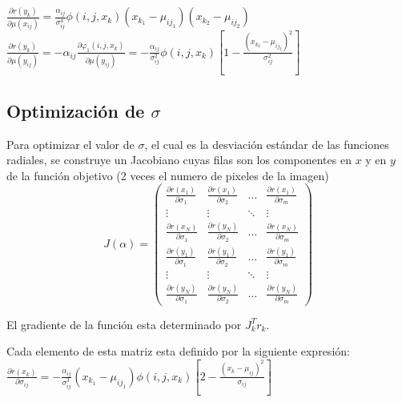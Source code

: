 \documentclass[10pt,journal,compsoc]{styles/IEEEtran}
\begin{document}
$\frac{\partial r(y_k)}{\partial \mu(x_{ij})}=\frac{\alpha_{ij}}{\sigma_{ij}^4}\phi(i,j,x_k)(x_{k_1}-\mu_{ij_1})(x_{k_2}-\mu_{ij_2})$\\

\small 
$\frac{\partial r(y_k)}{\partial \mu(y_{ij})}=- \alpha_{ij} \frac{\partial \varphi_1(i,j,x_k)}{\partial \mu(y_{ij})} =- \frac{\alpha_{ij}}{\sigma_{ij}^2}\phi(i,j,x_k)[1-\frac{(x_{k_2}-\mu_{ij_2})^2}{\sigma_{ij}^2}] $\\
\normalsize

\subsection{Optimización de $\sigma$}

Para optimizar el valor de $\sigma$, el cual es la desviación estándar de las funciones radiales, se construye un Jacobiano cuyas filas son los componentes en $x$ y en $y$ de la función objetivo (2 veces el numero de pixeles de la imagen)\\

\[J(\alpha)= \left( \begin{array}{cccc}
\frac{\partial r(x_1)}{\partial \sigma_1} & \frac{\partial r(x_1)}{\partial \sigma_2} & \ldots & \frac{\partial r(x_1)}{\partial \sigma_m} \\
\vdots & \vdots & \ddots & \vdots \\
\frac{\partial r(x_N)}{\partial \sigma_1} & \frac{\partial r(y_N)}{\partial \sigma_2} & \ldots & \frac{\partial r(x_N)}{\partial \sigma_m} \\
\frac{\partial r(y_1)}{\partial \sigma_1} & \frac{\partial r(y_1)}{\partial \sigma_2} & \ldots & \frac{\partial r(y_1)}{\partial \sigma_m} \\
\vdots & \vdots & \ddots & \vdots \\
\frac{\partial r(y_N)}{\partial \sigma_1} & \frac{\partial r(y_N)}{\partial \sigma_2} & \ldots & \frac{\partial r(y_N)}{\partial \sigma_m} 
\end{array} \right)\] 

El gradiente de la función esta determinado por $J_k^Tr_k$. 

Cada elemento de esta matriz esta definido por la siguiente expresión:\\

$\frac{\partial r(x_k)}{\partial \sigma_{ij}}=-\frac{\alpha_{ij}}{\sigma_{ij}^3}(x_{k_1}-\mu_{ij_1})\phi(i,j,x_k)[2-\frac{(x_k-\mu_{ij})^2}{\sigma_{ij}}]$\\
\end{document}
